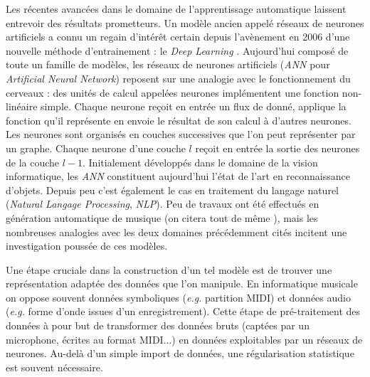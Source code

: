 \documentclass[a4paper, 10pt]{article} %
\begin{document}
Les récentes avancées dans le domaine de l'apprentissage automatique laissent entrevoir des résultats prometteurs. Un modèle ancien appelé réseaux de neurones artificiels a connu un regain d'intérêt certain depuis l'avènement en 2006 d'une nouvelle méthode d'entrainement : le \textit{Deep Learning} \cite{Hinton:2006:FLA:1161603.1161605}. 
Aujourd'hui composé de toute un famille de modèles, les réseaux de neurones artificiels (\textit{ANN} pour \textit{Artificial Neural Network}) reposent sur une analogie avec le fonctionnement du cerveaux : des unités de calcul appelées neurones implémentent une fonction non-linéaire simple. Chaque neurone reçoit en entrée un flux de donné, applique la fonction qu'il représente en envoie le résultat de son calcul à d'autres neurones. Les neurones sont organisés en couches successives que l'on peut représenter par un graphe. Chaque neurone d'une couche $l$ reçoit en entrée la sortie des neurones de la couche $l-1$.
Initialement développés dans le domaine de la vision informatique, les \textit{ANN} constituent aujourd'hui l'état de l'art en reconnaissance d'objets. Depuis peu c'est également le cas en traitement du langage naturel (\textit{Natural Langage Processing}, \textit{NLP}). Peu de travaux ont été effectués en génération automatique de musique (on citera tout de même \cite{boulanger2012modeling,DBLP:journals/corr/LiuR14a}), mais les nombreuses analogies avec les deux domaines précédemment cités incitent une investigation poussée de ces modèles.

Une étape cruciale dans la construction d'un tel modèle est de trouver une représentation adaptée des données que l'on manipule. En informatique musicale on oppose souvent données symboliques (\textit{e.g.} partition MIDI) et données audio (\textit{e.g.} forme d'onde issues d'un enregistrement). Cette étape de pré-traitement des données à pour but de transformer des données bruts  (captées par un microphone, écrites au format MIDI...) en données exploitables par un réseaux de neurones. Au-delà d'un simple import de données, une régularisation statistique est souvent nécessaire.
\end{document}
